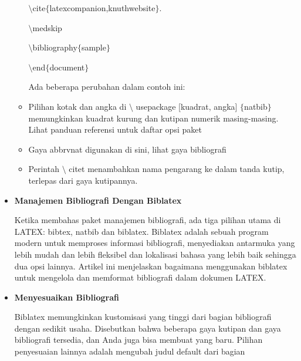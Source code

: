 \begin{itemize}
\begin{itemize}
$\setminus$cite$ \{ $latexcompanion,knuthwebsite$ \} $. \par

$\setminus$medskip\par

$\setminus$bibliography$ \{ $sample$ \} $\par

$\setminus$end$ \{ $document$ \} $\par

\hspace*{0.5in}
\vspace{12pt}\hspace*{0.5in}Ada beberapa perubahan dalam contoh ini:\par

	\item Pilihan kotak dan angka di $\setminus$ usepackage [kuadrat, angka] $ \{ $natbib$ \} $ memungkinkan kuadrat kurung dan kutipan numerik masing-masing. Lihat panduan referensi untuk daftar opsi paket\par

	\item Gaya abbrvnat digunakan di sini, lihat gaya bibliografi\par

	\item Perintah $\setminus$ citet menambahkan nama pengarang ke dalam tanda kutip, terlepas dari gaya kutipannya.
\end{itemize}\par

	\item {\fontsize{14pt}{14pt}\selectfont \textbf{Manajemen Bibliografi Dengan Biblatex}}\par

Ketika membahas paket manajemen bibliografi, ada tiga pilihan utama di LATEX: bibtex, natbib dan biblatex. Biblatex adalah sebuah program modern untuk memproses informasi bibliografi, menyediakan antarmuka yang lebih mudah dan lebih fleksibel dan lokalisasi bahasa yang lebih baik sehingga dua opsi lainnya. Artikel ini menjelaskan bagaimana menggunakan biblatex untuk mengelola dan memformat bibliografi dalam dokumen LATEX.\par

\vspace{12pt}
	\item {\fontsize{14pt}{14pt}\selectfont \textbf{Menyesuaikan Bibliografi}}\par

Biblatex memungkinkan kustomisasi yang tinggi dari bagian bibliografi dengan sedikit usaha. Disebutkan bahwa beberapa gaya kutipan dan gaya bibliografi tersedia, dan Anda juga bisa membuat yang baru. Pilihan penyesuaian lainnya adalah mengubah judul default dari bagian ~ \par


\end{itemize}
